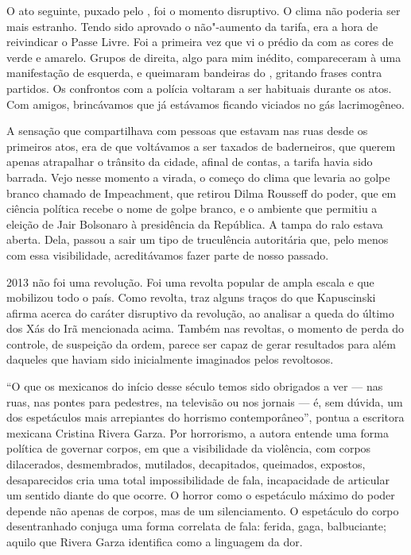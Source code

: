 O ato seguinte, puxado pelo , foi o momento disruptivo. O clima não
poderia ser mais estranho. Tendo sido aprovado o não"-aumento da tarifa,
era a hora de reivindicar o Passe Livre. Foi a primeira vez que vi o
prédio da  com as cores de verde e amarelo. Grupos de direita, algo
para mim inédito, compareceram à uma manifestação de esquerda, e
queimaram bandeiras do , gritando frases contra partidos. Os
confrontos com a polícia voltaram a ser habituais durante os atos. Com
amigos, brincávamos que já estávamos ficando viciados no gás
lacrimogêneo.

A sensação que compartilhava com pessoas que estavam nas ruas desde os
primeiros atos, era de que voltávamos a ser taxados de baderneiros, que
querem apenas atrapalhar o trânsito da cidade, afinal de contas, a
tarifa havia sido barrada. Vejo nesse momento a virada, o começo do
clima que levaria ao golpe branco chamado de Impeachment, que retirou
Dilma Rousseff do poder, que em ciência política recebe o nome de golpe
branco, e o ambiente que permitiu a eleição de Jair Bolsonaro à
presidência da República. A tampa do ralo estava aberta. Dela, passou a
sair um tipo de truculência autoritária que, pelo menos com essa
visibilidade, acreditávamos fazer parte de nosso passado.

2013 não foi uma revolução. Foi uma revolta popular de ampla escala e
que mobilizou todo o país. Como revolta, traz alguns traços do que
Kapuscinski afirma acerca do caráter disruptivo da revolução, ao
analisar a queda do último dos Xás do Irã mencionada acima. Também nas
revoltas, o momento de perda do controle, de suspeição da ordem, parece
ser capaz de gerar resultados para além daqueles que haviam sido
inicialmente imaginados pelos revoltosos.

\asterisc

``O que os mexicanos do início desse século temos sido obrigados a ver
--- nas ruas, nas pontes para pedestres, na televisão ou nos jornais ---
é, sem dúvida, um dos espetáculos mais arrepiantes do horrismo
contemporâneo'', pontua a escritora mexicana Cristina Rivera Garza. Por
horrorismo, a autora entende uma forma política de governar corpos, em
que a visibilidade da violência, com corpos dilacerados, desmembrados,
mutilados, decapitados, queimados, expostos, desaparecidos cria uma
total impossibilidade de fala, incapacidade de articular um sentido
diante do que ocorre. O horror como o espetáculo máximo do poder depende
não apenas de corpos, mas de um silenciamento. O espetáculo do corpo
desentranhado conjuga uma forma correlata de fala: ferida, gaga,
balbuciante; aquilo que Rivera Garza identifica como a linguagem da dor.


